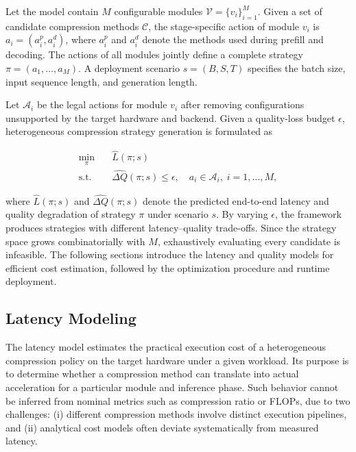 \documentclass[letterpaper]{article} %
\begin{document}
Let the model contain $M$ configurable modules $\mathcal{V}=\{v_i\}_{i=1}^{M}$. Given a set of candidate compression methods $\mathcal{C}$, the stage-specific action of module $v_i$ is $a_i=(a_i^{p},a_i^{d})$, where $a_i^{p}$ and $a_i^{d}$ denote the methods used during prefill and decoding. The actions of all modules jointly define a complete strategy $\pi=(a_1,\ldots,a_M)$. A deployment scenario $s=(B,S,T)$ specifies the batch size, input sequence length, and generation length.

Let $\mathcal{A}_i$ be the legal actions for module $v_i$ after removing configurations unsupported by the target hardware and backend. Given a quality-loss budget $\epsilon$, heterogeneous compression strategy generation is formulated as

\begin{equation}
\begin{aligned}
\min_{\pi}\quad
& \widehat{L}(\pi;s) \\
\mathrm{s.t.}\quad
& \widehat{\Delta Q}(\pi;s)\leq \epsilon,\quad
a_i\in\mathcal{A}_i,\; i=1,\ldots,M,
\end{aligned}
\label{eq:problem}
\end{equation}

where $\widehat{L}(\pi;s)$ and $\widehat{\Delta Q}(\pi;s)$ denote the predicted end-to-end latency and quality degradation of strategy $\pi$ under scenario $s$. By varying $\epsilon$, the framework produces strategies with different latency--quality trade-offs. Since the strategy space grows combinatorially with $M$, exhaustively evaluating every candidate is infeasible. The following sections introduce the latency and quality models for efficient cost estimation, followed by the optimization procedure and runtime deployment.



\subsection{Latency Modeling}

The latency model estimates the practical execution cost of a heterogeneous compression policy on the target hardware under a given workload. Its purpose is to determine whether a compression method can translate into actual acceleration for a particular module and inference phase. Such behavior cannot be inferred from nominal metrics such as compression ratio or FLOPs, due to two challenges: (i) different compression methods involve distinct execution pipelines, and (ii) analytical cost models often deviate systematically from measured latency.
\end{document}
